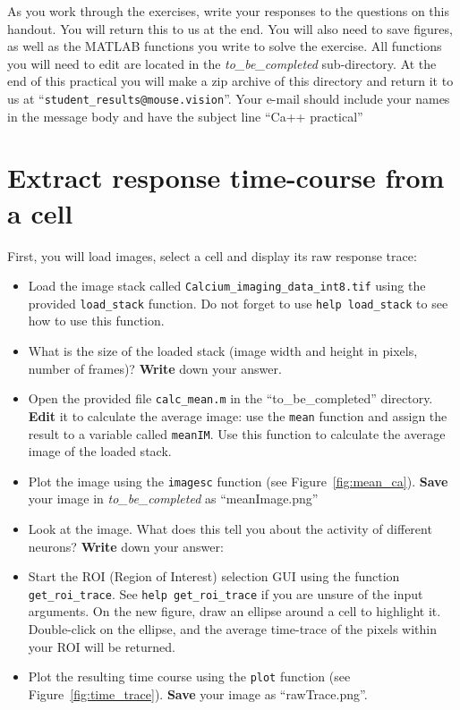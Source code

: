 \documentclass[paper=a4, fontsize=11pt]{article} %
\numberwithin{equation}{section} %
\numberwithin{figure}{section} %
\numberwithin{table}{section} %
\begin{document}
As you work through the exercises, write your responses to the questions on this handout.
You will return this to us at the end.
You will also need to save figures, as well as the MATLAB functions you write to solve the exercise.
All functions you will need to edit are located in the \emph{to\_be\_completed} sub-directory.
At the end of this practical you will make a zip archive of this directory and return it to us at ``\verb|student_results@mouse.vision|''.
Your e-mail should include your names in the message body and have the subject line ``Ca++ practical''


\section{Extract response time-course from a cell}

First, you will load images, select a cell and display its raw response trace:

\begin{itemize}
\item Load the image stack called \texttt{Calcium\_imaging\_data\_int8.tif} using the provided \texttt{load\_stack} function.
  Do not forget to use \texttt{help load\_stack} to see how to use this function.
\item What is the size of the loaded stack (image width and height in pixels, number of frames)? \textbf{Write} down your answer.
  \vspace{1em}
\item Open the provided file \texttt{calc\_mean.m} in the ``to\_be\_completed'' directory. \textbf{Edit} it to calculate the average image: use the \texttt{mean} function and assign the result to a variable called \texttt{meanIM}. Use this function to calculate the average image of the loaded stack.
\item Plot the image using the \texttt{imagesc} function (see Figure~\ref{fig:mean_ca}). \textbf{Save} your image in \emph{to\_be\_completed} as ``meanImage.png''
\item Look at the image. What does this tell you about the activity of different neurons? \textbf{Write} down your answer:
  \vspace{2em}
\item Start the ROI (Region of Interest) selection GUI using the function \texttt{get\_roi\_trace}. 
See \texttt{help get\_roi\_trace} if you are unsure of the input arguments.
On the new figure, draw an ellipse around a cell to highlight it. Double-click on the ellipse, and the average time-trace of the pixels within your ROI will be returned.
\item Plot the resulting time course using the \texttt{plot} function (see Figure~\ref{fig:time_trace}). \textbf{Save} your image as ``rawTrace.png''.
\end{itemize}
\end{document}
